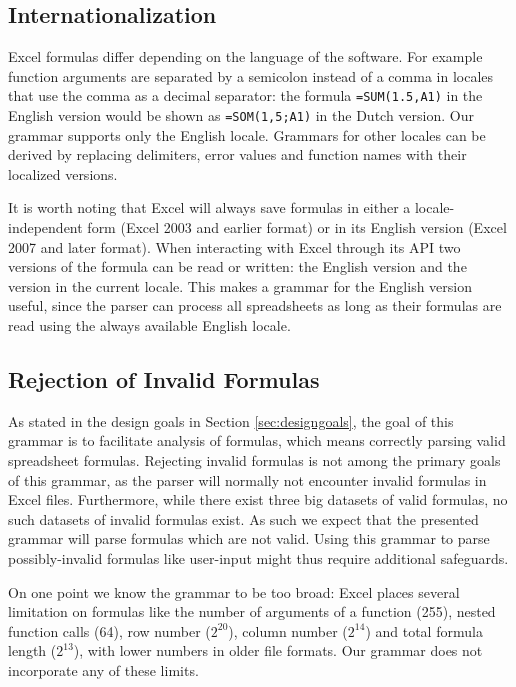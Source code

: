 \documentclass[times]{smrauth}
\begin{document}
\subsection{Internationalization}

Excel formulas differ depending on the language of the software. For example function arguments are separated by a semicolon instead of a comma in locales that use the comma as a decimal separator: the formula \texttt{=SUM(1.5,A1)} in the English version would be shown as \texttt{=SOM(1,5;A1)} in the Dutch version.
Our grammar supports only the English locale.
Grammars for other locales can be derived by replacing delimiters, error values and function names with their localized versions.

It is worth noting that Excel will always save formulas in either a locale-independent form (Excel 2003 and earlier format) or in its English version (Excel 2007 and later format). When interacting with Excel through its API two versions of the formula can be read or written: the English version and the version in the current locale.
This makes a grammar for the English version useful, since the parser can process all spreadsheets as long as their formulas are read using the always available English locale.

\subsection{Rejection of Invalid Formulas}

As stated in the design goals in Section \ref{sec:designgoals}, the goal of this grammar is to facilitate analysis of formulas, which means correctly parsing valid spreadsheet formulas.
Rejecting invalid formulas is not among the primary goals of this grammar, as the parser will normally not encounter invalid formulas in Excel files.
Furthermore, while there exist three big datasets of valid formulas, no such datasets of invalid formulas exist.
As such we expect that the presented grammar will parse formulas which are not valid.
Using this grammar to parse possibly-invalid formulas like user-input might thus require additional safeguards.

On one point we know the grammar to be too broad: Excel places several limitation on formulas like the number of arguments of a function (255), nested function calls (64), row number ($2^{20}$), column number ($2^{14}$) and total formula length ($2^{13}$), with lower numbers in older file formats.
Our grammar does not incorporate any of these limits.
\end{document}
